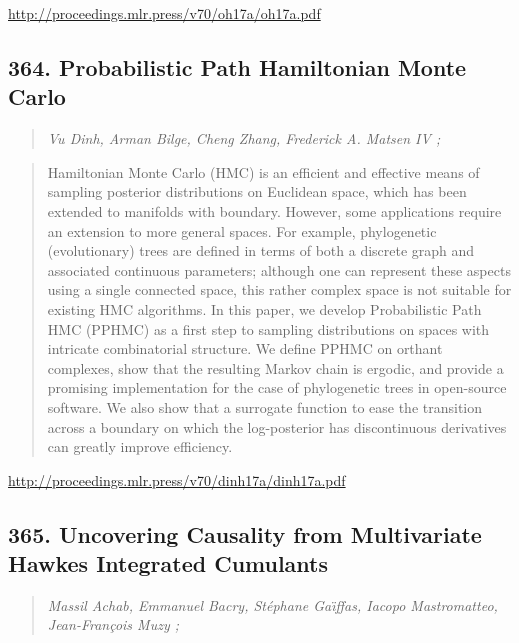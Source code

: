 \documentclass{article}
\begin{document}
\href{http://proceedings.mlr.press/v70/oh17a/oh17a.pdf}{http://proceedings.mlr.press/v70/oh17a/oh17a.pdf}

\subsection{364. Probabilistic Path Hamiltonian Monte Carlo}

\begin{quote}
\footnotesize{\textit{Vu Dinh, Arman Bilge, Cheng Zhang, Frederick A. Matsen IV ;}}

\end{quote}

\begin{quote}
    Hamiltonian Monte Carlo (HMC) is an efficient and effective means of sampling posterior distributions on Euclidean space, which has been extended to manifolds with boundary. However, some applications require an extension to more general spaces. For example, phylogenetic (evolutionary) trees are defined in terms of both a discrete graph and associated continuous parameters; although one can represent these aspects using a single connected space, this rather complex space is not suitable for existing HMC algorithms. In this paper, we develop Probabilistic Path HMC (PPHMC) as a first step to sampling distributions on spaces with intricate combinatorial structure. We define PPHMC on orthant complexes, show that the resulting Markov chain is ergodic, and provide a promising implementation for the case of phylogenetic trees in open-source software. We also show that a surrogate function to ease the transition across a boundary on which the log-posterior has discontinuous derivatives can greatly improve efficiency.  
\end{quote}

\href{http://proceedings.mlr.press/v70/dinh17a/dinh17a.pdf}{http://proceedings.mlr.press/v70/dinh17a/dinh17a.pdf}

\subsection{365. Uncovering Causality from Multivariate Hawkes Integrated Cumulants}

\begin{quote}
\footnotesize{\textit{Massil Achab, Emmanuel Bacry, Stéphane Gaı̈ffas, Iacopo Mastromatteo, Jean-François Muzy ;}}

\end{quote}
\end{document}
